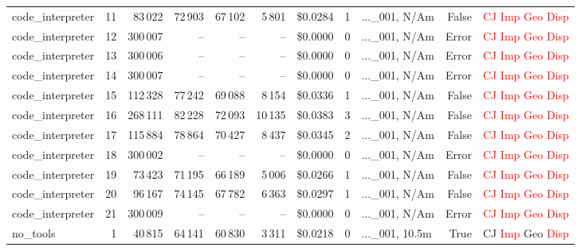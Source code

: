 \documentclass[a4paper,11pt]{article}
\begin{document}
\begin{table}[H]
{\begin{tabular}{l r r r r r r r l r l}
code\_interpreter & 11 & 83\,022 & 72\,903 & 67\,102 & 5\,801 & \$0.0284 & 1 & ...\_001, N/Am & False & \textcolor{red}{CJ} \textcolor{red}{Imp} \textcolor{red}{Geo} \textcolor{red}{Disp} \\
code\_interpreter & 12 & 300\,007 & -- & -- & -- & \$0.0000 & 0 & ...\_001, N/Am & Error & \textcolor{red}{CJ} \textcolor{red}{Imp} \textcolor{red}{Geo} \textcolor{red}{Disp} \\
code\_interpreter & 13 & 300\,006 & -- & -- & -- & \$0.0000 & 0 & ...\_001, N/Am & Error & \textcolor{red}{CJ} \textcolor{red}{Imp} \textcolor{red}{Geo} \textcolor{red}{Disp} \\
code\_interpreter & 14 & 300\,007 & -- & -- & -- & \$0.0000 & 0 & ...\_001, N/Am & Error & \textcolor{red}{CJ} \textcolor{red}{Imp} \textcolor{red}{Geo} \textcolor{red}{Disp} \\
code\_interpreter & 15 & 112\,328 & 77\,242 & 69\,088 & 8\,154 & \$0.0336 & 1 & ...\_001, N/Am & False & \textcolor{red}{CJ} \textcolor{red}{Imp} \textcolor{red}{Geo} \textcolor{red}{Disp} \\
code\_interpreter & 16 & 268\,111 & 82\,228 & 72\,093 & 10\,135 & \$0.0383 & 3 & ...\_001, N/Am & False & \textcolor{red}{CJ} \textcolor{red}{Imp} \textcolor{red}{Geo} \textcolor{red}{Disp} \\
code\_interpreter & 17 & 115\,884 & 78\,864 & 70\,427 & 8\,437 & \$0.0345 & 2 & ...\_001, N/Am & False & \textcolor{red}{CJ} \textcolor{red}{Imp} \textcolor{red}{Geo} \textcolor{red}{Disp} \\
code\_interpreter & 18 & 300\,002 & -- & -- & -- & \$0.0000 & 0 & ...\_001, N/Am & Error & \textcolor{red}{CJ} \textcolor{red}{Imp} \textcolor{red}{Geo} \textcolor{red}{Disp} \\
code\_interpreter & 19 & 73\,423 & 71\,195 & 66\,189 & 5\,006 & \$0.0266 & 1 & ...\_001, N/Am & False & \textcolor{red}{CJ} \textcolor{red}{Imp} \textcolor{red}{Geo} \textcolor{red}{Disp} \\
code\_interpreter & 20 & 96\,167 & 74\,145 & 67\,782 & 6\,363 & \$0.0297 & 1 & ...\_001, N/Am & False & \textcolor{red}{CJ} \textcolor{red}{Imp} \textcolor{red}{Geo} \textcolor{red}{Disp} \\
code\_interpreter & 21 & 300\,009 & -- & -- & -- & \$0.0000 & 0 & ...\_001, N/Am & Error & \textcolor{red}{CJ} \textcolor{red}{Imp} \textcolor{red}{Geo} \textcolor{red}{Disp} \\
\midrule
no\_tools & 1 & 40\,815 & 64\,141 & 60\,830 & 3\,311 & \$0.0218 & 0 & ...\_001, 10.5m & True & CJ \textcolor{red}{Imp} Geo \textcolor{red}{Disp} \\

\end{tabular}}
\end{table}
\end{document}
